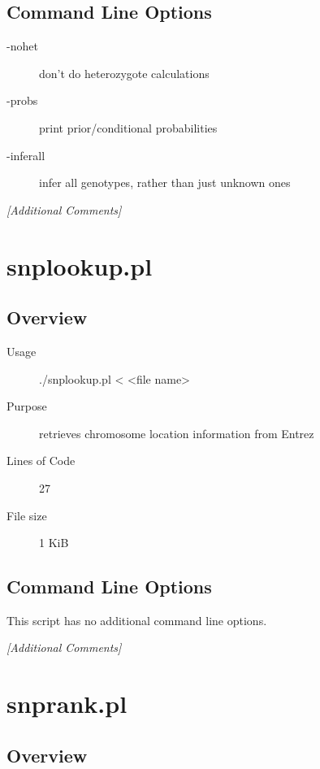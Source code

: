 \subsection{Command Line Options}
\label{sec:snpimpute.pl-command-line}

\begin{description}
\item[-nohet] don't do heterozygote calculations
\item[-probs] print prior/conditional probabilities
\item[-inferall] infer all genotypes, rather than just unknown ones
\end{description}

\emph{[Additional Comments]}

\section{snplookup.pl}
\label{sec:snplookup.pl}

\subsection{Overview}
\label{sec:snplookup.pl-overview}

\begin{description}
\item[Usage] ./snplookup.pl < <file name>
\item[Purpose] retrieves chromosome location information from Entrez
\item[Lines of Code] 27
\item[File size] 1 KiB
\end{description}

\subsection{Command Line Options}
\label{sec:snplookup.pl-command-line}

This script has no additional command line options.

\emph{[Additional Comments]}

\section{snprank.pl}
\label{sec:snprank.pl}

\subsection{Overview}
\label{sec:snprank.pl-overview}

